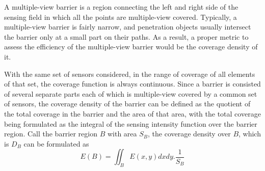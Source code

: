 A multiple-view barrier is a region connecting the left and right side of the sensing field in which all the points are multiple-view covered. Typically, a multiple-view barrier is fairly narrow, and penetration objects usually intersect the barrier only at a small part on their paths. As a result, a proper metric to assess the efficiency of the multiple-view barrier would be the coverage density of it.

With the same set of sensors considered, in the range of coverage of all elements of that set, the coverage function is always continuous. Since a barrier is consisted of several separate parts each of which is multiple-view covered by a common set of sensors, the coverage density of the barrier can be defined as the quotient of the total coverage in the barrier and the area of that area, with the total coverage being formulated as the integral of the sensing intensity function over the barrier region. Call the barrier region $B$ with area $S_B$, the coverage density over $B$, which is $D_B$ can be formulated as
\begin{equation}
\label{eq5}
E(B) = \iint_B{E(x, y)dxdy}.\frac{1}{S_B}
\end{equation}

